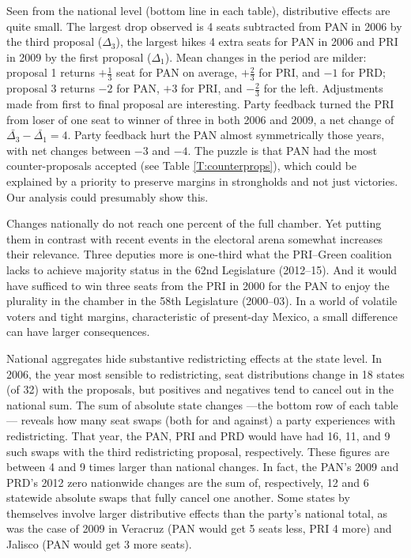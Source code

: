 \documentclass[letter,12pt]{article}
\begin{document}
Seen from the national level (bottom line in each table), distributive effects are quite small. The largest drop observed is 4 seats subtracted from PAN in 2006 by the third proposal ($\Delta_3$), the largest hikes 4 extra seats for PAN in 2006 and PRI in 2009 by the first proposal ($\Delta_1$). Mean changes in the period are milder: proposal 1 returns $+\frac{1}{3}$ seat for PAN on average, $+\frac{2}{3}$ for PRI, and $-1$ for PRD; proposal 3 returns $-2$ for PAN, $+3$ for PRI, and $-\frac{2}{3}$ for the left. Adjustments made from first to final proposal are interesting. Party feedback turned the PRI from loser of one seat to winner of three in both 2006 and 2009, a net change of $\bar{\Delta_3} - \bar{\Delta_1} = 4$. Party feedback hurt the PAN almost symmetrically those years, with net changes between $-3$ and $-4$. The puzzle is that PAN had the most counter-proposals accepted (see Table \ref{T:counterprops}), which could be explained by a priority to preserve margins in strongholds and not just victories. Our analysis could presumably show this. 

Changes nationally do not reach one percent of the full chamber. Yet putting them in contrast with recent events in the electoral arena somewhat increases their relevance. Three deputies more is one-third what the PRI--Green coalition lacks to achieve majority status in the 62nd Legislature (2012--15). And it would have sufficed to win three seats from the PRI in 2000 for the PAN to enjoy the plurality in the chamber in the 58th Legislature (2000--03). In a world of volatile voters and tight margins, characteristic of present-day Mexico, a small difference can have larger consequences. 

National aggregates hide substantive redistricting effects at the state level. In 2006, the year most sensible to redistricting, seat distributions change in 18 states (of 32) with the proposals, but positives and negatives tend to cancel out in the national sum. The sum of absolute state changes ---the bottom row of each table--- reveals how many seat swaps (both for and against) a party experiences with redistricting. That year, the PAN, PRI and PRD would have had 16, 11, and 9 such swaps with the third redistricting proposal, respectively. These figures are between 4 and 9 times larger than national changes. In fact, the PAN's 2009 and PRD's 2012 zero nationwide changes are the sum of, respectively, 12 and 6 statewide absolute swaps that fully cancel one another. Some states by themselves involve larger distributive effects than the party's national total, as was the case of 2009 in Veracruz (PAN would get 5 seats less, PRI 4 more) and Jalisco (PAN would get 3 more seats). 
\end{document}
